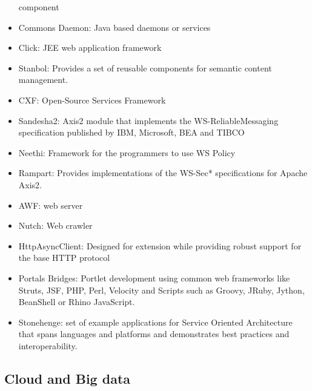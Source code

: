 \documentclass[12pt]{report}
\begin{document}
\begin{itemize}
  component
\item
  Commons Daemon: Java based daemons or services
\item
  Click: JEE web application framework
\item
  Stanbol: Provides a set of reusable components for semantic content
  management.
\item
  CXF: Open-Source Services Framework
\item
  Sandesha2: Axis2 module that implements the WS-ReliableMessaging
  specification published by IBM, Microsoft, BEA and TIBCO
\item
  Neethi: Framework for the programmers to use WS Policy
\item
  Rampart: Provides implementations of the WS-Sec* specifications for
  Apache Axis2.
\item
  AWF: web server
\item
  Nutch: Web crawler
\item
  HttpAsyncClient: Designed for extension while providing robust support
  for the base HTTP protocol
\item
  Portals Bridges: Portlet development using common web frameworks like
  Struts, JSF, PHP, Perl, Velocity and Scripts such as Groovy, JRuby,
  Jython, BeanShell or Rhino JavaScript.
\item
  Stonehenge: set of example applications for Service Oriented
  Architecture that spans languages and platforms and demonstrates best
  practices and interoperability.
\end{itemize}

\subsection{Cloud and Big data}\label{cloud-and-big-data}
\end{document}
